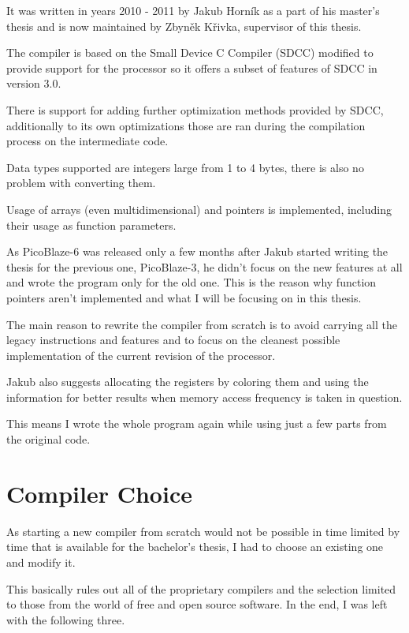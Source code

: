     It was written in years 2010 - 2011 by Jakub Horník as a part of his master's thesis and is now maintained by Zbyněk Křivka, supervisor of this thesis.

    The compiler is based on the Small Device C Compiler (SDCC) modified to provide support for the processor so it offers a subset of features of SDCC in version 3.0.

    There is support for adding further optimization methods provided by SDCC, additionally to its own optimizations those are ran during the compilation process on the intermediate code.

    Data types supported are integers large from 1 to 4 bytes, there is also no problem with converting them.

    Usage of arrays (even multidimensional) and pointers is implemented, including their usage as function parameters.

    As PicoBlaze-6 was released only a few months after Jakub started writing the thesis for the previous one, PicoBlaze-3, he didn't focus on the new features at all and wrote the program only for the old one. This is the reason why function pointers aren't implemented and what I will be focusing on in this thesis.

    The main reason to rewrite the compiler from scratch is to avoid carrying all the legacy instructions and features and to focus on the cleanest possible implementation of the current revision of the processor.

    Jakub also suggests allocating the registers by coloring them and using the information for better results when memory access frequency is taken in question.

    This means I wrote the whole program again while using just a few parts from the original code.

\chapter{Compiler Choice}\label{compiler}

As starting a new compiler from scratch would not be possible in time limited by time that is available for the bachelor's thesis, I had to choose an existing one and modify it.

This basically rules out all of the proprietary compilers and the selection limited to those from the world of free and open source software. In the end, I was left with the following three.


